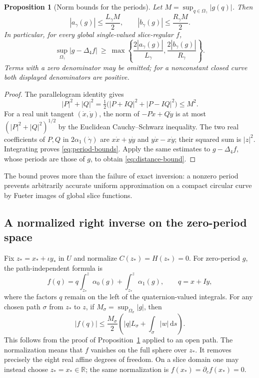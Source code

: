 \documentclass[11pt,a4paper]{article}
\numberwithin{equation}{section}
\newtheorem{proposition}[theorem]{Proposition}
\theoremstyle{definition}
\theoremstyle{remark}
\newcommand{\R}{\mathbb R}
\newcommand{\lap}{\Delta_4}
\newcommand{\dd}{\,\mathrm d}
\begin{document}
\begin{proposition}[Norm bounds for the periods]\label{prop:bounds}
Let $M=\sup_{q\in\Omega_\gamma}|g(q)|$. Then
\begin{equation}\label{eq:period-bounds}
 |a_\gamma(g)|\le\frac{L_\gamma M}{2},\qquad
 |b_\gamma(g)|\le\frac{R_\gamma M}{2}.
\end{equation}
In particular, for every global single-valued slice-regular $f$,
\begin{equation}\label{eq:distance-bound}
 \sup_{\Omega_\gamma}|g-\lap f|\ \geq\
 \max\left\{\frac{2|a_\gamma(g)|}{L_\gamma},
             \frac{2|b_\gamma(g)|}{R_\gamma}\right\}.
\end{equation}
Terms with a zero denominator may be omitted; for a nonconstant closed curve
both displayed denominators are positive.
\end{proposition}
\begin{proof}
The parallelogram identity gives
\[
 |P|^2+|Q|^2=\tfrac12\bigl(|P+IQ|^2+|P-IQ|^2\bigr)\leq M^2.
\]
For a real unit tangent $(\dot x,\dot y)$, the norm of
$-P\dot x+Q\dot y$ is at most $(|P|^2+|Q|^2)^{1/2}$ by the Euclidean
Cauchy--Schwarz inequality. The two real coefficients of $P,Q$ in
$2\alpha_1(\dot\gamma)$ are
$x\dot x+y\dot y$ and $y\dot x-x\dot y$; their squared sum is $|z|^2$.
Integrating proves \eqref{eq:period-bounds}. Apply the same estimates to
$g-\lap f$, whose periods are those of $g$, to obtain
\eqref{eq:distance-bound}.
\end{proof}

The bound proves more than the failure of exact inversion: a nonzero period
prevents arbitrarily accurate uniform approximation on a compact circular
curve by Fueter images of global slice functions.

\subsection{A normalized right inverse on the zero-period space}
Fix $z_*=x_*+\iota y_*$ in $U$ and normalize $C(z_*)=H(z_*)=0$. For zero-period
$g$, the path-independent formula is
\begin{equation}\label{eq:path-inverse}
 f(q)=q\int_{z_*}^{z}\alpha_0(g)+\int_{z_*}^{z}\alpha_1(g),
 \qquad q=x+Iy,
\end{equation}
where the factors $q$ remain on the left of the quaternion-valued integrals.
For any chosen path $\sigma$ from $z_*$ to $z$, if
$M_\sigma=\sup_{\Omega_\sigma}|g|$, then
\begin{equation}\label{eq:path-bound}
 |f(q)|\leq\frac{M_\sigma}{2}
  \left(|q|L_\sigma+\int_\sigma|w|\dd s\right).
\end{equation}
This follows from the proof of Proposition~\ref{prop:bounds} applied to an
open path. The normalization means that $f$ vanishes on the full sphere over
$z_*$. It removes precisely the eight real affine degrees of freedom. On a
slice domain one may instead choose $z_*=x_*\in\R$; the same normalization
is $f(x_*)=\partial_c f(x_*)=0$.
\end{document}
